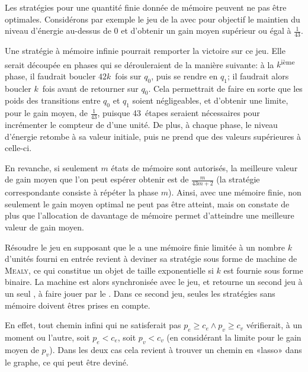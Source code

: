 \begin{remark}
Les stratégies pour une quantité finie donnée de mémoire peuvent ne pas être optimales.
Considérons par exemple le jeu de la  avec pour objectif le maintien du niveau d'énergie au-dessus de $0$ et d'obtenir un gain moyen supérieur ou égal à $\frac1{43}$.

Une stratégie à mémoire infinie pourrait remporter la victoire sur ce jeu.
Elle serait découpée en phases qui se dérouleraient de la manière suivante: à la $k$\textsuperscript{ième} phase, il faudrait boucler $42k$~fois sur $q_0$, puis se rendre en $q_1$; il faudrait alors boucler $k$~fois avant de retourner sur $q_0$.
Cela permettrait de faire en sorte que les poids des transitions entre $q_0$ et $q_1$ soient négligeables, et d'obtenir une limite, pour le gain moyen, de $\frac1{43}$, puisque 43~étapes seraient nécessaires pour incrémenter le compteur de  d'une unité.
De plus, à chaque phase, le niveau d'énergie retombe à sa valeur initiale, puis ne prend que des valeurs supérieures à celle-ci.

En revanche, si seulement $m$ états de mémoire sont autorisés, la meilleure valeur de gain moyen que l'on peut espérer obtenir est de $\frac{m}{43m+2}$ (la stratégie correspondante consiste à répéter la phase $m$).
Ainsi, avec une mémoire finie, non seulement le gain moyen optimal ne peut pas être atteint, mais on constate de plus que l'allocation de davantage de mémoire permet d'atteindre une meilleure valeur de gain moyen.
\end{remark}

Résoudre le jeu en supposant que le \jo a une mémoire finie limitée à un nombre $k$ d'unités fourni en entrée revient à deviner sa stratégie sous forme de machine de \textsc{Mealy}, ce qui constitue un objet de taille exponentielle si $k$ est fournie sous forme binaire.
La machine est alors synchronisée avec le jeu, et retourne un second jeu à un seul , à faire jouer par le \ji.
Dans ce second jeu, seules les stratégies sans mémoire doivent êtres prises en compte.

En effet, tout chemin infini qui ne satisferait pas $p_e \geq c_e \wedge p_v \geq c_v$ vérifierait, à un moment ou l'autre, soit $p_e < c_e$, soit $p_v < c_v$ (en considérant la limite pour le gain moyen de $p_v$).
Dans les deux cas cela revient à trouver un chemin en «lasso» dans le graphe, ce qui peut être deviné.

